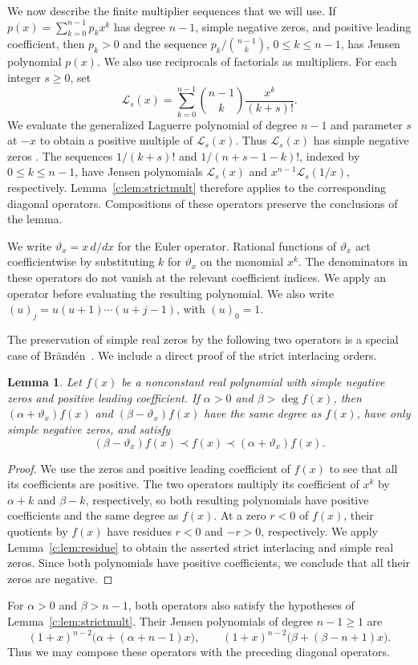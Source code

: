 \documentclass[10pt,a4paper]{article}
\numberwithin{equation}{section}
\newtheorem{lemma}[theorem]{Lemma}
\theoremstyle{remark}\newtheorem{remark}[theorem]{Remark}
\newcommand{\varthetax}{\vartheta_x}
\begin{document}
We now describe the finite multiplier sequences that we will use.
If $p(x)=\sum_{k=0}^{n-1}p_kx^k$
has degree $n-1$, simple negative zeros, and positive leading coefficient,
then $p_k>0$ and the sequence $p_k/\binom{n-1}{k}$, $0\le k\le n-1$,
has Jensen polynomial $p(x)$.
We also use reciprocals of factorials as multipliers. For each integer
$s\ge0$, set
\[
 \mathscr L_s(x)=\sum_{k=0}^{n-1}\binom{n-1}{k}\frac{x^k}{(k+s)!}.
\]
We evaluate the generalized Laguerre polynomial of degree $n-1$ and
parameter $s$ at $-x$ to obtain a positive multiple of $\mathscr L_s(x)$.
Thus $\mathscr L_s(x)$ has simple negative zeros
\cite[Sections 18.2(vi) and 18.5(iii)]{DLMF}.
The sequences $1/(k+s)!$ and $1/(n+s-1-k)!$, indexed by $0\le k\le n-1$,
have Jensen polynomials $\mathscr L_s(x)$ and $x^{n-1}\mathscr L_s(1/x)$,
respectively. Lemma~\ref{c:lem:strictmult} therefore applies to the
corresponding diagonal operators. Compositions of these operators preserve
the conclusions of the lemma.

We write $\varthetax=x\,d/dx$ for the Euler operator. Rational functions
of $\varthetax$ act coefficientwise by substituting $k$ for $\varthetax$
on the monomial $x^k$. The denominators in these operators do not vanish
at the relevant coefficient indices. We apply an operator before evaluating
the resulting polynomial. We also write $(u)_j=u(u+1)\cdots(u+j-1)$, with $(u)_0=1$.

The preservation of simple real zeros by the following two operators is
a special case of Br\"and\'en~\cite[Corollary~3.5]{BrandenPF}.
We include a direct proof of the strict interlacing orders.

\begin{lemma}\label{c:lem:euler}
Let $f(x)$ be a nonconstant real polynomial with simple negative zeros
and positive leading coefficient. If $\alpha>0$ and $\beta>\deg f(x)$, then
$(\alpha+\varthetax)f(x)$ and $(\beta-\varthetax)f(x)$ have the same degree
as $f(x)$, have only simple negative zeros, and satisfy
\[
 (\beta-\varthetax)f(x)\prec f(x)\prec(\alpha+\varthetax)f(x).
\]
\end{lemma}
\begin{proof}
We use the zeros and positive leading coefficient of $f(x)$ to see that
all its coefficients are positive. The two operators multiply its coefficient of $x^k$ by
$\alpha+k$ and $\beta-k$, respectively, so both resulting polynomials have positive
coefficients and the same degree as $f(x)$. At a zero $r<0$ of $f(x)$,
their quotients by $f(x)$ have residues $r<0$ and $-r>0$, respectively.
We apply Lemma~\ref{c:lem:residue} to obtain the asserted strict interlacing and simple
real zeros. Since both polynomials have positive coefficients, we conclude that all their zeros are negative.
\end{proof}
For $\alpha>0$ and $\beta>n-1$, both operators
also satisfy the hypotheses of Lemma~\ref{c:lem:strictmult}.
Their Jensen polynomials of degree $n-1\ge1$ are
\[
 (1+x)^{n-2}\bigl(\alpha+(\alpha+n-1)x\bigr),\qquad
 (1+x)^{n-2}\bigl(\beta+(\beta-n+1)x\bigr).
\]
Thus we may compose these operators with the preceding diagonal operators.
\end{document}
